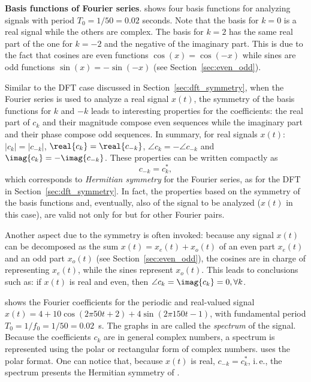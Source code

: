 \bExample \textbf{Basis functions of Fourier series}.
 shows four basis functions for analyzing signals with period $T_0 = 1/50=0.02$ seconds. Note that the basis for $k=0$ is a real signal while the others are complex. The basis for $k=2$ has the same real part of the one for $k=-2$ and the negative of the imaginary part. This is due to the fact that cosines are even functions $\cos(x)=\cos(-x)$ while sines are odd functions $\sin(x)=-\sin(-x)$ (see Section~\ref{sec:even_odd}).
\eExample

Similar to the DFT case discussed in Section~\ref{sec:dft_symmetry},
when the Fourier series is used to analyze a real signal $x(t)$, the symmetry of the basis functions for $k$ and $-k$ leads to interesting properties for the coefficients: the real part of $c_k$ and their magnitude compose even sequences while the imaginary part and their phase compose odd sequences.
In summary, for real signals $x(t)$: $|c_k| = |c_{-k}|$, $\real{c_k} = \real{c_{-k}}$, $\angle {c_k}=-\angle {c_{-k}}$ and $\imag{c_k} = -\imag{c_{-k}}$. These properties can be written compactly as 
\begin{equation}
c_{-k} = c_k^*,
\label{eq:hermitianSymmetry}
\end{equation}
which corresponds to \emph{Hermitian symmetry} for the Fourier series, as for the DFT in Section~\ref{sec:dft_symmetry}.
In fact, the properties based on the symmetry of the basis functions and, eventually, also of the signal to be analyzed ($x(t)$ in this case), are valid not only for  but for other Fourier pairs.

Another aspect due to the symmetry is often invoked: because any signal $x(t)$ can be decomposed  as the sum $x(t)=x_e(t) + x_o(t)$ of an even part $x_e(t)$ and an odd part $x_o(t)$ (see Section~\ref{sec:even_odd}), the cosines are in charge of representing $x_e(t)$, while the sines represent $x_o(t)$. This leads to conclusions such as: if $x(t)$ is real and even,
then $\angle{c_k}=\imag{c_k}=0, \forall k$.

 shows the Fourier coefficients for the periodic and real-valued signal $x(t)=4 + 10\cos(2 \pi 50 t + 2) + 4\sin(2 \pi 150 t - 1)$, with fundamental period $T_0 = 1/f_0 = 1/50=0.02$~s.
The graphs in  are called the \emph{spectrum} of the signal. Because the coefficients $c_k$ are in general complex numbers, a spectrum is represented using the polar or rectangular form of complex numbers.   uses the polar format. One can notice that, because $x(t)$ is real, $c_{-k} = c_k^*$, i.\,e., the spectrum presents the Hermitian symmetry of .

